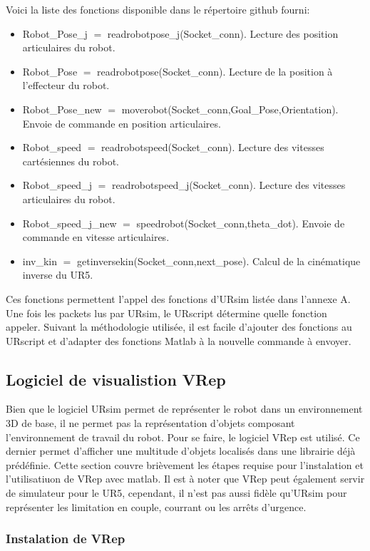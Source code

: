Voici la liste des fonctions disponible dans le répertoire github fourni: 
\begin{itemize}
\item Robot\_Pose\_j $=$ readrobotpose\_j(Socket\_conn).	Lecture des position articulaires du robot.
\item Robot\_Pose $=$ readrobotpose(Socket\_conn).			Lecture de la position à l'effecteur du robot.
\item Robot\_Pose\_new $=$ moverobot(Socket\_conn,Goal\_Pose,Orientation).	Envoie de commande en position articulaires.
\item Robot\_speed $=$ readrobotspeed(Socket\_conn).		Lecture des vitesses cartésiennes du robot.
\item Robot\_speed\_j $=$ readrobotspeed\_j(Socket\_conn).	Lecture des vitesses articulaires du robot.
\item Robot\_speed\_j\_new $=$ speedrobot(Socket\_conn,theta\_dot). Envoie de commande en vitesse articulaires.
\item inv\_kin $=$ getinversekin(Socket\_conn,next\_pose).	Calcul de la cinématique inverse du UR5.
\end{itemize}



Ces fonctions permettent l'appel des fonctions d'URsim listée dans l'annexe A.
Une fois les packets lus par URsim, le URscript détermine quelle fonction appeler.
Suivant la méthodologie utilisée, il est facile d'ajouter des fonctions au URscript et d'adapter des fonctions Matlab à la nouvelle commande à envoyer.

\subsection{Logiciel de visualistion VRep}

Bien que le logiciel URsim permet de représenter le robot dans un environnement 3D de base, il ne permet pas la représentation d'objets composant l'environnement de travail du robot.
Pour se faire, le logiciel VRep est utilisé.
Ce dernier permet d'afficher une multitude d'objets localisés dans une librairie déjà prédéfinie.
Cette section couvre brièvement les étapes requise pour l'instalation et l'utilisatiuon de VRep avec matlab.
Il est à noter que VRep peut également servir de simulateur pour le UR5, cependant, il n'est pas aussi fidèle qu'URsim pour représenter les limitation en couple, courrant ou les arrêts d'urgence.

\subsubsection{Instalation de VRep}

